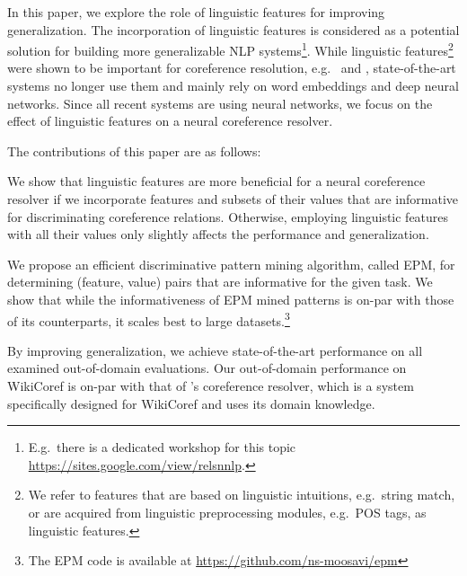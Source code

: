 In this paper, we explore the role of linguistic features for improving generalization.
The incorporation of linguistic features is considered as a potential solution for building more generalizable NLP 
systems\footnote{E.g.\ there is a dedicated workshop for this topic \url{https://sites.google.com/view/relsnnlp}.}.
While linguistic features\footnote{We refer to features that are based on linguistic intuitions, e.g.\ string match, 
or are acquired from linguistic preprocessing modules, e.g.\ POS tags, as linguistic features.} were shown to be important for coreference resolution, e.g.\  and ,
state-of-the-art systems no longer use them and mainly rely on word embeddings and deep neural networks. 
Since all recent systems are using neural networks, we focus on the effect of linguistic features on a neural coreference resolver. 

The contributions of this paper are as follows: 

\squishlist
\item We show that linguistic features are more beneficial for a neural coreference resolver if we incorporate 
features and subsets of their values that are informative for discriminating coreference relations.
Otherwise, employing linguistic features with all their values  
only slightly affects the performance and generalization.
\item We propose an efficient discriminative pattern mining algorithm, called EPM, for determining (feature, value) pairs that are informative for the given task.
We show that while the informativeness of EPM mined patterns is on-par with those of its counterparts,
it scales best to large datasets.\footnote{The EPM code is available at \url{https://github.com/ns-moosavi/epm}}  
\item By improving generalization, 
we achieve state-of-the-art performance on all examined out-of-domain evaluations. 
Our out-of-domain performance on WikiCoref is on-par with that of 's coreference resolver, which is a system specifically designed for WikiCoref and uses its domain knowledge.
\squishend